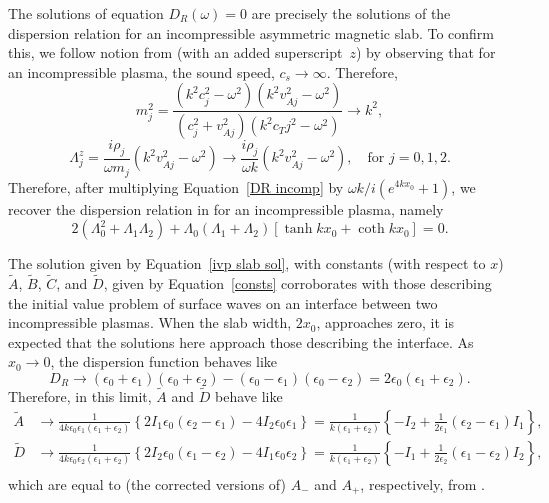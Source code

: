 \documentclass{aastex61}
\begin{document}
The solutions of equation $D_R(\omega) = 0$ are precisely the solutions of the dispersion relation for an incompressible asymmetric magnetic slab. To confirm this, we follow notion from \cite{zsa_etal18} (with an added superscript~$z$) by observing that for an incompressible plasma, the sound speed, $c_s \to \infty$. Therefore,
\begin{equation}
m_j^2 = \frac{(k^2c_j^2 - \omega^2)(k^2v_{Aj}^2 - \omega^2)}{(c_j^2 + v_{Aj}^2)(k^2c_Tj^2 - \omega^2)} \to k^2,
\end{equation}
\begin{equation}
\Lambda_j^z = \frac{i\rho_j}{\omega m_j}(k^2v_{Aj}^2 - \omega^2) \to \frac{i \rho_j}{\omega k}(k^2v_{Aj}^2 - \omega^2), \quad \text{for } j = 0,1,2.
\end{equation}
Therefore, after multiplying Equation~\eqref{DR incomp} by $\omega k / i(e^{4kx_0} + 1)$, we recover the dispersion relation in \cite{zsa_etal18} for an incompressible plasma, namely
\begin{equation}
2(\Lambda_0^2 + \Lambda_1\Lambda_2) + \Lambda_0(\Lambda_1 + \Lambda_2)[\tanh{kx_0} + \coth{kx_0}] = 0.
\end{equation}

The solution given by Equation~\eqref{ivp slab sol}, with constants (with respect to $x$) $\tilde{A}$, $\tilde{B}$, $\tilde{C}$, and $\tilde{D}$, given by Equation~\eqref{consts} corroborates with those describing the initial value problem of surface waves on an interface between two incompressible plasmas. When the slab width, $2x_0$, approaches zero, it is expected that the solutions here approach those describing the interface. As $x_ 0 \to 0$, the dispersion function behaves like
\begin{equation}
D_R \to (\epsilon_0 + \epsilon_1)(\epsilon_0 + \epsilon_2) - (\epsilon_0 - \epsilon_1)(\epsilon_0 - \epsilon_2) = 2\epsilon_0(\epsilon_1 + \epsilon_2).
\end{equation}
Therefore, in this limit, $\tilde{A}$ and $\tilde{D}$ behave like
\begin{align}
\tilde{A} &\to \frac{1}{4k\epsilon_0\epsilon_1(\epsilon_1 + \epsilon_2)} \left\{ 2I_1\epsilon_0(\epsilon_2 - \epsilon_1) - 4I_2\epsilon_0\epsilon_1 \right\} = \frac{1}{k(\epsilon_1 + \epsilon_2)} \left\{ -I_2 + \frac{1}{2\epsilon_1}(\epsilon_2 - \epsilon_1)I_1 \right\}, \\
\tilde{D} &\to \frac{1}{4k\epsilon_0\epsilon_2(\epsilon_1 + \epsilon_2)} \left\{ 2I_2\epsilon_0(\epsilon_1 - \epsilon_2) - 4I_1\epsilon_0\epsilon_2 \right\} = \frac{1}{k(\epsilon_1 + \epsilon_2)} \left\{ -I_1 + \frac{1}{2\epsilon_2}(\epsilon_1 - \epsilon_2)I_2 \right\}, \\
\end{align}
which are equal to (the corrected versions of) $A_-$ and $A_+$, respectively, from \cite{rae_etal81}.
\end{document}
